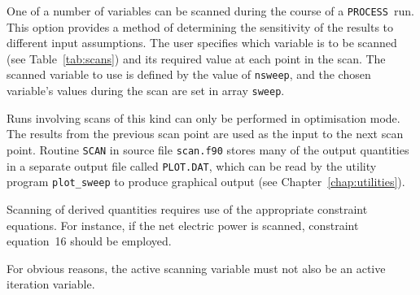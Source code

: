 \documentclass[11pt,a4paper]{report}
\newcommand{\process}{\mbox{\texttt{PROCESS}}}
\begin{document}
One of a number of variables can be scanned during the course of a \process\
run.  This option provides a method of determining the sensitivity of the
results to different input assumptions. The user specifies which variable is
to be scanned (see Table~\ref{tab:scans}) and its required value at each point
in the scan. The scanned variable to use is defined by the value of
\texttt{nsweep}, and the chosen variable's values during the scan are set in
array \texttt{sweep}.

Runs involving scans of this kind can only be performed in optimisation mode.
The results from the previous scan point are used as the input to the next
scan point. Routine \texttt{SCAN} in source file \texttt{scan.f90} stores many
of the output quantities in a separate output file called \texttt{PLOT.DAT},
which can be read by the utility program \texttt{plot\_sweep} to produce
graphical output (see Chapter~\ref{chap:utilities}).

Scanning of derived quantities requires use of the appropriate constraint
equations. For instance, if the net electric power is scanned, constraint
equation~16 should be employed.

For obvious reasons, the active scanning variable must not also be an active
iteration variable.

\end{document}
